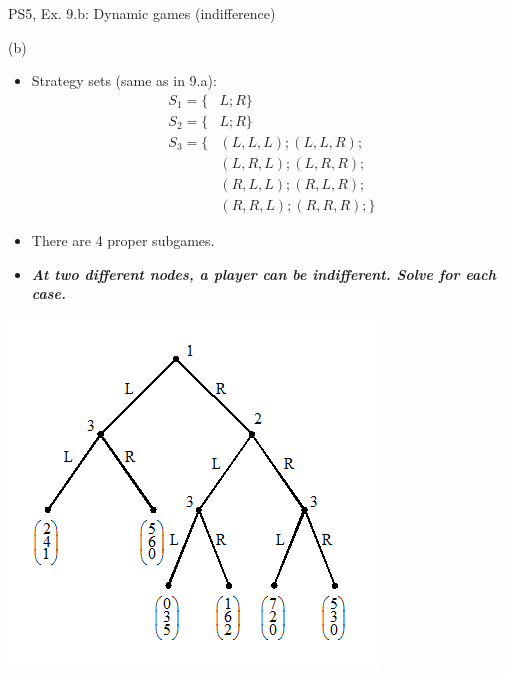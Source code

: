 \begin{frame}{PS5, Ex. 9.b: Dynamic games (indifference)}
  \begin{multicols}{2}
    (b)
    \begin{itemize}
      \item Strategy sets (same as in 9.a):
      \begin{align*}
        S_1=\{&L;R\}\\
        S_2=\{&L;R\}\\
        S_3=\{&(L,L,L);(L,L,R);\\
              &(L,R,L);(L,R,R);\\
              &(R,L,L);(R,L,R);\\
              &(R,R,L);(R,R,R);\}
      \end{align*}
      \item There are 4 proper subgames.
      \item \textbf{\textit{At two different nodes, a player can be indifferent. Solve for each case.}}
    \end{itemize}
    \vfill\null \columnbreak
    \includegraphics[width=1.2\columnwidth]{figures/Set_5_figure_2}
    \vfill\null
  \end{multicols}
\end{frame}

